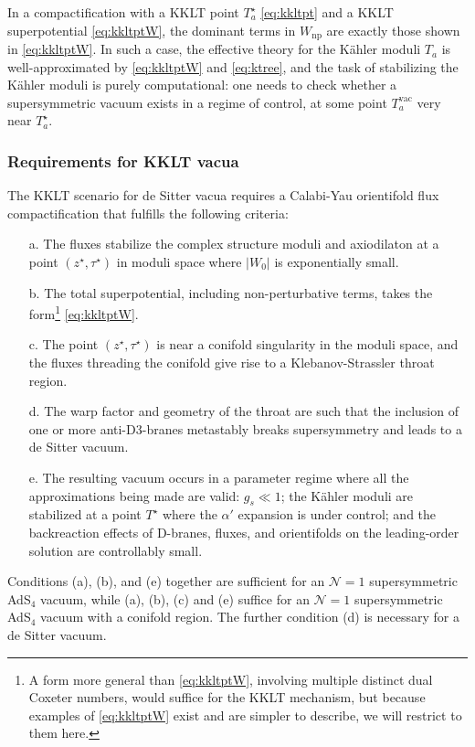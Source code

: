 \documentclass[12pt,a4wide]{article}
\begin{document}
In a compactification with a KKLT point $T_a^{\star}$ \eqref{eq:kkltpt} and a KKLT superpotential \eqref{eq:kkltptW},
the dominant terms in $W_{\text{np}}$
are exactly those shown in \eqref{eq:kkltptW}.  In such a case, the effective theory for the K\"ahler moduli $T_a$ is well-approximated by \eqref{eq:kkltptW} and \eqref{eq:ktree}, and the task of stabilizing the K\"ahler moduli  is purely computational: one needs to check whether a supersymmetric vacuum exists in a regime of control, at some point $T_a^{\text{vac}}$ very near $T_a^{\star}$.
 
\subsubsection{Requirements for KKLT vacua}\label{sec:explicitkkltgen}

The KKLT scenario for de Sitter vacua requires a Calabi-Yau orientifold flux compactification that fulfills the following criteria:
\begin{enumerate}
    \item[a.] The fluxes stabilize the complex structure moduli and axiodilaton at a point $(z^{\star},\tau^{\star})$ in moduli space where $|W_0|$ is exponentially small. 
    \item[b.] The total superpotential, including non-perturbative terms, takes the form\footnote{A form more general than
    \eqref{eq:kkltptW}, involving multiple distinct dual Coxeter numbers, would suffice for the KKLT mechanism, but because examples of \eqref{eq:kkltptW} exist and are simpler to describe, we will restrict to them here.} \eqref{eq:kkltptW}.
    \item[c.] The point $(z^{\star},\tau^{\star})$ is near a conifold singularity in the moduli space, and the fluxes threading the conifold give rise to a Klebanov-Strassler \cite{Klebanov:2000hb} throat region.
    \item[d.] The warp factor and geometry of the throat are such that the inclusion of one or more anti-D3-branes metastably breaks supersymmetry \cite{Kachru:2002gs} and leads to a de Sitter vacuum.
    \item[e.] The resulting vacuum occurs in a parameter regime where all the approximations being made are valid: $g_s \ll 1$; the K\"ahler moduli are stabilized at a point $T^{\star}$ where the $\alpha'$ expansion is under control; and the backreaction effects of D-branes, fluxes, and orientifolds  on the leading-order solution are controllably small.
\end{enumerate}
Conditions (a), (b), and (e) together are sufficient for an $\mathcal{N}=1$ supersymmetric AdS$_4$ vacuum, while (a), (b), (c) and (e) suffice for an $\mathcal{N}=1$ supersymmetric AdS$_4$ vacuum with a conifold region.
The further condition (d) is necessary for a de Sitter vacuum.
 
\end{document}
